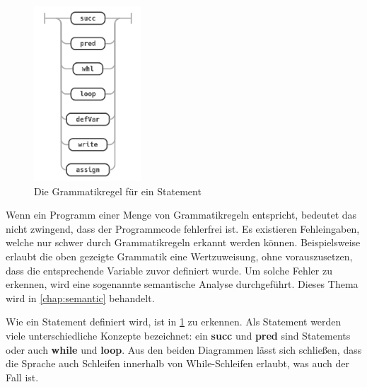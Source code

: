 \begin{figure}[h!]
	\centering
	\includegraphics[width=4cm]{content/pictures/statement.png}
	\caption{Die Grammatikregel für ein Statement}
	\label{pic:WhileRegelStatement}
\end{figure}

Wenn ein Programm einer Menge von Grammatikregeln entspricht, bedeutet das nicht zwingend, dass der Programmcode fehlerfrei ist. Es existieren Fehleingaben, welche nur schwer durch Grammatikregeln erkannt werden können. Beispielsweise erlaubt die oben gezeigte Grammatik eine Wertzuweisung, ohne vorauszusetzen, dass die entsprechende Variable zuvor definiert wurde. Um solche Fehler zu erkennen, wird eine sogenannte semantische Analyse durchgeführt. Dieses Thema wird in \cref{chap:semantic} behandelt.

Wie ein Statement definiert wird, ist in \cref{pic:WhileRegelStatement} zu erkennen. Als Statement werden viele unterschiedliche Konzepte bezeichnet: ein \textbf{succ} und \textbf{pred} sind Statements oder auch \textbf{while} und \textbf{loop}. Aus den beiden Diagrammen lässt sich schließen, dass die Sprache auch Schleifen innerhalb von While-Schleifen erlaubt, was auch der Fall ist.


